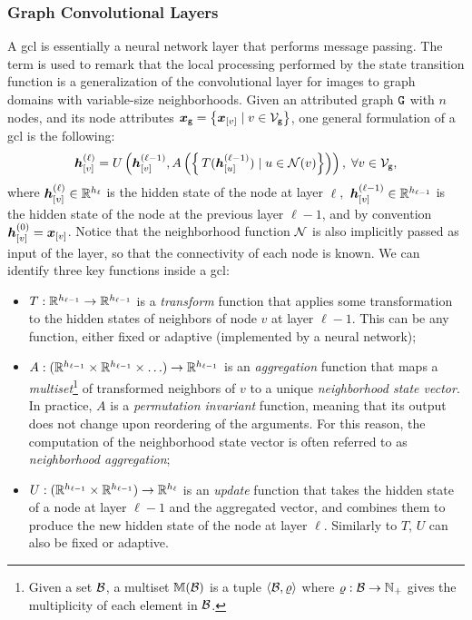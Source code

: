 \subsubsection*{Graph Convolutional Layers}\label{sec:graph-conv-layers}
A \gls{gcl} is essentially a neural network layer that performs message passing. The term  is used to remark that the local processing performed by the state transition function is a generalization of the convolutional layer for images to graph domains with variable-size neighborhoods. Given an attributed graph $\AttrGraph{g}$ with $n$ nodes, and its node attributes $\GraphFeatures{x}{g} = \Set{\Elem{x}{v} \mid v \in \Nodes{g}}$, one general formulation of a \gls{gcl} is the following:
\begin{align}
    \label{eq:simple-aggregation}
    \StateVector{v}{\ell} = U \Par{\StateVector{v}{\ell-1}, A\Par{\Set{\,T(\StateVector{u}{\ell-1}) \mid u \in \Neigh(v)}}}, \; \forall v \in \Nodes{g},
\end{align}
where $\StateVector{v}{\ell} \in \Real^{h_\ell}$ is the hidden state of the node at layer $\ell$, $\,\StateVector{v}{\ell-1} \in \Real^{h_{\ell-1}}$ is the hidden state of the node at the previous layer $\ell-1$, and by convention $\StateVector{v}{0} = \Elem{x}{v}$. Notice that the neighborhood function $\Neigh$ is also implicitly passed as input of the layer, so that the connectivity of each node is known. We can identify three key functions inside a \gls{gcl}:
\begin{itemize}
    \item $T: \mathbb{R}^{h_{\ell-1}} \rightarrow \mathbb{R}^{h_{\ell-1}}$ is a \emph{transform} function that applies some transformation to the hidden states of neighbors of node $v$ at layer $\ell-1$. This can be any function, either fixed or adaptive (implemented by a neural network);
    \item $A: (\mathbb{R}^{h_{\ell-1}} \times \mathbb{R}^{h_{\ell-1}} \times \ldots) \rightarrow \mathbb{R}^{h_{\ell-1}}$ is an \emph{aggregation} function that maps a \emph{multiset}\footnote{Given a set $\Cal{B}$, a multiset $\Multiset(\Cal{B})$ is a tuple $\Tuple{\Cal{B}, \varrho}$ where $\varrho: \Cal{B} \shortrightarrow \Natural_+$ gives the multiplicity of each element in $\Cal{B}$.} of transformed neighbors of $v$ to a unique \emph{neighborhood state vector}. In practice, $A$ is a \emph{permutation invariant} function, meaning that its output does not change upon reordering of the arguments. For this reason, the computation of the neighborhood state vector is often referred to as \emph{neighborhood aggregation};
    \item $U: (\mathbb{R}^{h_{\ell-1}} \times \mathbb{R}^{h_{\ell-1}}) \rightarrow \mathbb{R}^{h_{\ell}}$ is an \emph{update} function that takes the hidden state of a node at layer $\ell-1$ and the aggregated vector, and combines them to produce the new hidden state of the node at layer $\ell$. Similarly to $T$, $U$ can also be fixed or adaptive.
\end{itemize}
